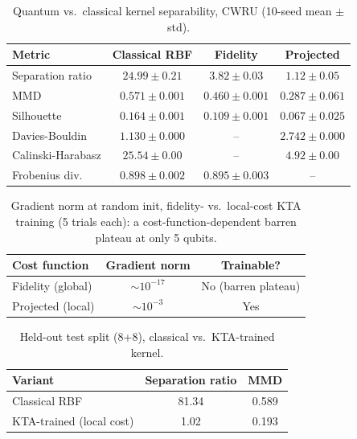 \documentclass[3p,times,procedia]{elsarticle}
\begin{document}
\begin{table}[ht]
\caption{Quantum vs.\ classical kernel separability, CWRU (10-seed mean $\pm$ std).}
\label{tab:qkernel}
\centering
\begin{tabular}{lccc}
\toprule
\textbf{Metric} & \textbf{Classical RBF} & \textbf{Fidelity} & \textbf{Projected} \\
\midrule
Separation ratio & $24.99 \pm 0.21$ & $3.82 \pm 0.03$ & $1.12 \pm 0.05$ \\
MMD & $0.571 \pm 0.001$ & $0.460 \pm 0.001$ & $0.287 \pm 0.061$ \\
Silhouette & $0.164 \pm 0.001$ & $0.109 \pm 0.001$ & $0.067 \pm 0.025$ \\
Davies-Bouldin & $1.130 \pm 0.000$ & -- & $2.742 \pm 0.000$ \\
Calinski-Harabasz & $25.54 \pm 0.00$ & -- & $4.92 \pm 0.00$ \\
Frobenius div. & $0.898 \pm 0.002$ & $0.895 \pm 0.003$ & -- \\
\bottomrule
\end{tabular}
\end{table}

\begin{table}[ht]
\caption{Gradient norm at random init, fidelity- vs.\ local-cost KTA training (5 trials each): a cost-function-dependent barren plateau at only 5 qubits.}
\label{tab:barren}
\centering
\begin{tabular}{lcc}
\toprule
\textbf{Cost function} & \textbf{Gradient norm} & \textbf{Trainable?} \\
\midrule
Fidelity (global) & $\sim 10^{-17}$ & No (barren plateau) \\
Projected (local) & $\sim 10^{-3}$ & Yes \\
\bottomrule
\end{tabular}
\end{table}

\begin{table}[ht]
\caption{Held-out test split (8+8), classical vs.\ KTA-trained kernel.}
\label{tab:kta}
\centering
\begin{tabular}{lcc}
\toprule
\textbf{Variant} & \textbf{Separation ratio} & \textbf{MMD} \\
\midrule
Classical RBF & 81.34 & 0.589 \\
KTA-trained (local cost) & 1.02 & 0.193 \\
\bottomrule
\end{tabular}
\end{table}
\end{document}

